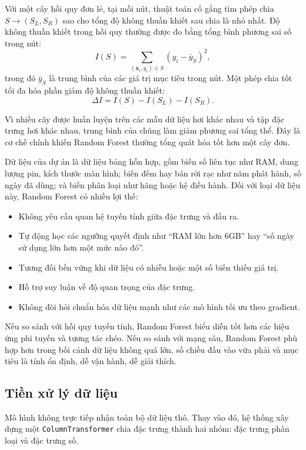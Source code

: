 Với một cây hồi quy đơn lẻ, tại mỗi nút, thuật toán cố gắng tìm phép chia $S \to (S_L, S_R)$ sao cho tổng độ không thuần khiết sau chia là nhỏ nhất. Độ không thuần khiết trong hồi quy thường được đo bằng tổng bình phương sai số trong nút:
$$
I(S) = \sum_{(\mathbf{x}_i, y_i) \in S} (y_i - \bar{y}_S)^2,
$$
trong đó $\bar{y}_S$ là trung bình của các giá trị mục tiêu trong nút. Một phép chia tốt tối đa hóa phần giảm độ không thuần khiết:
$$
\Delta I = I(S) - I(S_L) - I(S_R).
$$

Vì nhiều cây được huấn luyện trên các mẫu dữ liệu hơi khác nhau và tập đặc trưng hơi khác nhau, trung bình của chúng làm giảm phương sai tổng thể. Đây là cơ chế chính khiến Random Forest thường tổng quát hóa tốt hơn một cây đơn.


Dữ liệu của dự án là dữ liệu bảng hỗn hợp, gồm biến số liên tục như RAM, dung lượng pin, kích thước màn hình; biến đếm hay bán rời rạc như năm phát hành, số ngày đã dùng; và biến phân loại như hãng hoặc hệ điều hành. Đối với loại dữ liệu này, Random Forest có nhiều lợi thế:

\begin{itemize}
    \item Không yêu cầu quan hệ tuyến tính giữa đặc trưng và đầu ra.
    \item Tự động học các ngưỡng quyết định như ``RAM lớn hơn 6GB'' hay ``số ngày sử dụng lớn hơn một mức nào đó''.
    \item Tương đối bền vững khi dữ liệu có nhiễu hoặc một số biến thiếu giá trị.
    \item Hỗ trợ suy luận về độ quan trọng của đặc trưng.
    \item Không đòi hỏi chuẩn hóa dữ liệu mạnh như các mô hình tối ưu theo gradient.
\end{itemize}

Nếu so sánh với hồi quy tuyến tính, Random Forest biểu diễn tốt hơn các hiệu ứng phi tuyến và tương tác chéo. Nếu so sánh với mạng sâu, Random Forest phù hợp hơn trong bối cảnh dữ liệu không quá lớn, số chiều đầu vào vừa phải và mục tiêu là tính ổn định, dễ vận hành, dễ giải thích.

\subsection{Tiền xử lý dữ liệu}

Mô hình không trực tiếp nhận toàn bộ dữ liệu thô. Thay vào đó, hệ thống xây dựng một \texttt{ColumnTransformer} chia đặc trưng thành hai nhóm: đặc trưng phân loại và đặc trưng số.


